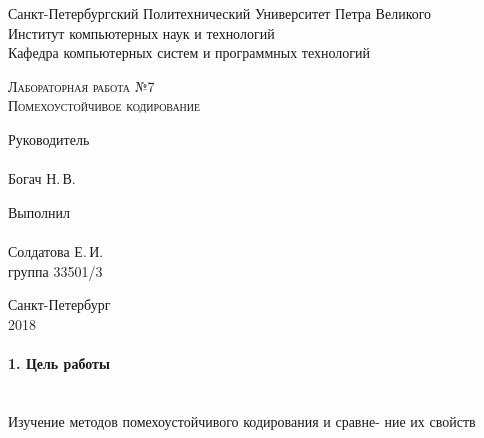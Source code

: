 \documentclass[12pt,a4paper]{report}
\begin{document}
\begin{titlepage}
\newpage
  \begin{center}
     
    Санкт-Петербургский Политехнический Университет Петра Великого \\
    
    Институт компьютерных наук и технологий \\
    
    Кафедра компьютерных систем и программных технологий
    \end{center}
    
    \vspace{15em}
    \begin{center}
    \textsc{Лабораторная работа №7}\\
    \vspace{5mm}
    \textsc{Помехоустойчивое кодирование}
    	
   \end{center}
\vspace{10em}

\newlength{\ML}
\hfill\begin{minipage}{0.45\textwidth}
\vfill
  Руководитель \\
  \\
  \underline{\hspace{\ML}} Богач Н.\,В.\\
 
\end{minipage}%
\bigskip

\hfill\begin{minipage}{0.45\textwidth}
  Выполнил\\
  \\
  \underline{\hspace{\ML}} Солдатова Е.\,И.\\
  группа 33501/3
\end{minipage}%

\vspace{\fill}
\begin{center}
    
  Санкт-Петербург\\
   2018 
\end{center}
\end{titlepage}

\paragraph{1. Цель работы\\\\}
Изучение методов помехоустойчивого кодирования и сравне-
ние их свойств
\end{document}
